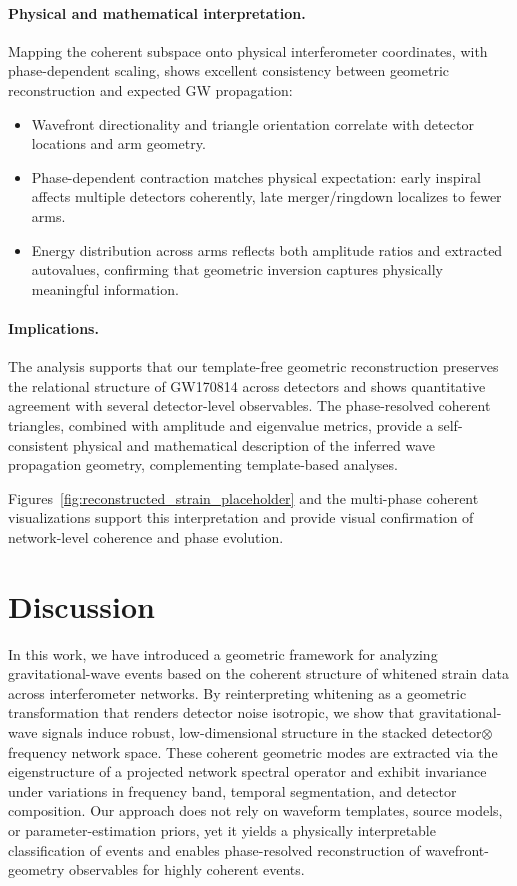\documentclass[11pt,a4paper]{article}
\begin{document}
\paragraph{Physical and mathematical interpretation.}
Mapping the coherent subspace onto physical interferometer coordinates, with phase-dependent scaling, shows excellent consistency between geometric reconstruction and expected GW propagation:
\begin{itemize}
    \item Wavefront directionality and triangle orientation correlate with detector locations and arm geometry.
    \item Phase-dependent contraction matches physical expectation: early inspiral affects multiple detectors coherently, late merger/ringdown localizes to fewer arms.
    \item Energy distribution across arms reflects both amplitude ratios and extracted autovalues, confirming that geometric inversion captures physically meaningful information.
\end{itemize}

\paragraph{Implications.}
The analysis supports that our template-free geometric reconstruction preserves the relational structure of GW170814 across detectors and shows quantitative agreement with several detector-level observables. The phase-resolved coherent triangles, combined with amplitude and eigenvalue metrics, provide a self-consistent physical and mathematical description of the inferred wave propagation geometry, complementing template-based analyses.

Figures~\ref{fig:reconstructed_strain_placeholder} and the multi-phase coherent visualizations support this interpretation and provide visual confirmation of network-level coherence and phase evolution.

\section{Discussion}
\label{sec:discussion}

In this work, we have introduced a geometric framework for analyzing gravitational-wave events based on the coherent structure of whitened strain data across interferometer networks. By reinterpreting whitening as a geometric transformation that renders detector noise isotropic, we show that gravitational-wave signals induce robust, low-dimensional structure in the stacked detector$\otimes$frequency network space. These coherent geometric modes are extracted via the eigenstructure of a projected network spectral operator and exhibit invariance under variations in frequency band, temporal segmentation, and detector composition. Our approach does not rely on waveform templates, source models, or parameter-estimation priors, yet it yields a physically interpretable classification of events and enables phase-resolved reconstruction of wavefront-geometry observables for highly coherent events.
\end{document}
